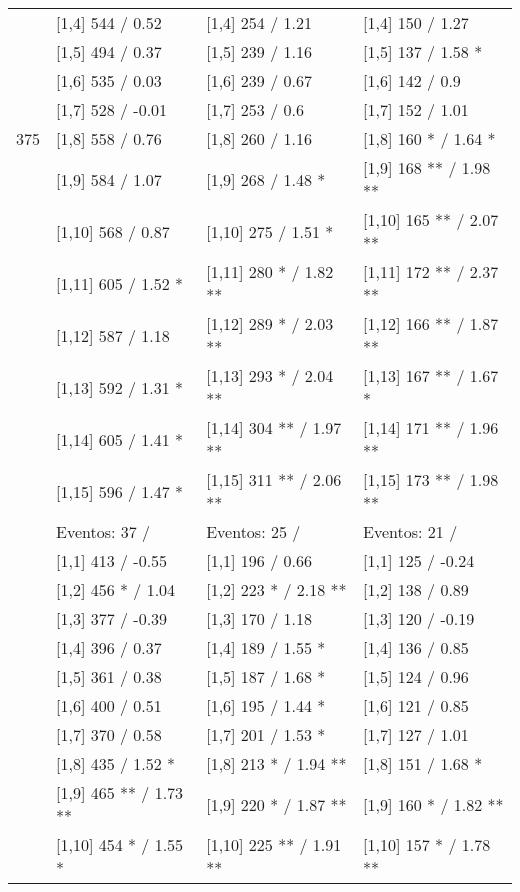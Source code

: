 \begin{table}
\begin{tabular}[t]{llll}
\addlinespace
 & {}[1,4] 544  / 0.52 & {}[1,4] 254  / 1.21 & {}[1,4] 150  / 1.27\\
 & {}[1,5] 494  / 0.37 & {}[1,5] 239  / 1.16 & {}[1,5] 137  / 1.58 *\\
 & {}[1,6] 535  / 0.03 & {}[1,6] 239  / 0.67 & {}[1,6] 142  / 0.9\\
 & {}[1,7] 528  / -0.01 & {}[1,7] 253  / 0.6 & {}[1,7] 152  / 1.01\\
375 & {}[1,8] 558  / 0.76 & {}[1,8] 260  / 1.16 & {}[1,8] 160 * / 1.64 *\\
\addlinespace
 & {}[1,9] 584  / 1.07 & {}[1,9] 268  / 1.48 * & {}[1,9] 168 ** / 1.98 **\\
 & {}[1,10] 568  / 0.87 & {}[1,10] 275  / 1.51 * & {}[1,10] 165 ** / 2.07 **\\
 & {}[1,11] 605  / 1.52 * & {}[1,11] 280 * / 1.82 ** & {}[1,11] 172 ** / 2.37 **\\
 & {}[1,12] 587  / 1.18 & {}[1,12] 289 * / 2.03 ** & {}[1,12] 166 ** / 1.87 **\\
 & {}[1,13] 592  / 1.31 * & {}[1,13] 293 * / 2.04 ** & {}[1,13] 167 ** / 1.67 *\\
\addlinespace
 & {}[1,14] 605  / 1.41 * & {}[1,14] 304 ** / 1.97 ** & {}[1,14] 171 ** / 1.96 **\\
 & {}[1,15] 596  / 1.47 * & {}[1,15] 311 ** / 2.06 ** & {}[1,15] 173 ** / 1.98 **\\
 & Eventos:  37 / & Eventos:  25 / & Eventos:  21 /\\
 & {}[1,1] 413  / -0.55 & {}[1,1] 196  / 0.66 & {}[1,1] 125  / -0.24\\
 & {}[1,2] 456 * / 1.04 & {}[1,2] 223 * / 2.18 ** & {}[1,2] 138  / 0.89\\
\addlinespace
 & {}[1,3] 377  / -0.39 & {}[1,3] 170  / 1.18 & {}[1,3] 120  / -0.19\\
 & {}[1,4] 396  / 0.37 & {}[1,4] 189  / 1.55 * & {}[1,4] 136  / 0.85\\
 & {}[1,5] 361  / 0.38 & {}[1,5] 187  / 1.68 * & {}[1,5] 124  / 0.96\\
 & {}[1,6] 400  / 0.51 & {}[1,6] 195  / 1.44 * & {}[1,6] 121  / 0.85\\
 & {}[1,7] 370  / 0.58 & {}[1,7] 201  / 1.53 * & {}[1,7] 127  / 1.01\\
\addlinespace
500 & {}[1,8] 435  / 1.52 * & {}[1,8] 213 * / 1.94 ** & {}[1,8] 151  / 1.68 *\\
 & {}[1,9] 465 ** / 1.73 ** & {}[1,9] 220 * / 1.87 ** & {}[1,9] 160 * / 1.82 **\\
 & {}[1,10] 454 * / 1.55 * & {}[1,10] 225 ** / 1.91 ** & {}[1,10] 157 * / 1.78 **\\

\end{tabular}
\end{table}
